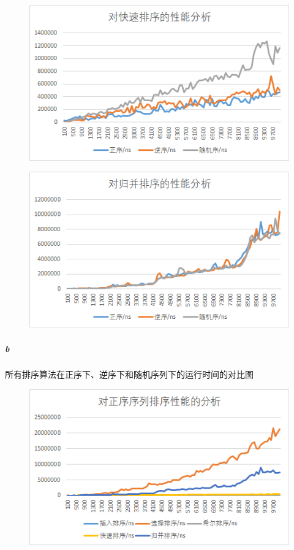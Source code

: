 \documentclass[UTF8]{ctexart}
\begin{document}
        \begin{figure}[H]
          \includegraphics[width=\textwidth]{quicksort}
          \centering
        \end{figure}
        \begin{figure}[H]
          \includegraphics[width=\textwidth]{mergesort}
          \centering
        \end{figure}
      \subparagraph{b} 所有排序算法在正序下、逆序下和随机序列下的运行时间的对比图
        \begin{figure}[H]
          \includegraphics[width=\textwidth]{seq}
          \centering
        \end{figure}
\end{document}
